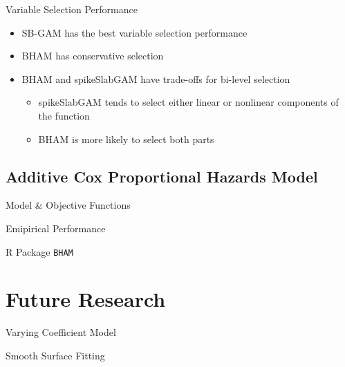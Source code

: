 \documentclass[
  ignorenonframetext,
  aspectratio=169]{beamer}
\providecommand{\tightlist}{%
  \setlength{\itemsep}{0pt}\setlength{\parskip}{0pt}}
\begin{document}
\begin{frame}{Variable Selection Performance}
\protect\hypertarget{variable-selection-performance}{}
\begin{itemize}
\tightlist
\item
  SB-GAM has the best variable selection performance
\item
  BHAM has conservative selection
\item
  BHAM and spikeSlabGAM have trade-offs for bi-level selection

  \begin{itemize}
  \tightlist
  \item
    spikeSlabGAM tends to select either linear or nonlinear components
    of the function
  \item
    BHAM is more likely to select both parts
  \end{itemize}
\end{itemize}
\end{frame}

\hypertarget{additive-cox-proportional-hazards-model}{%
\subsection{Additive Cox Proportional Hazards
Model}\label{additive-cox-proportional-hazards-model}}

\begin{frame}{Model \& Objective Functions}
\protect\hypertarget{model-objective-functions}{}
\end{frame}

\begin{frame}{Emipirical Performance}
\protect\hypertarget{emipirical-performance}{}
\end{frame}

\begin{frame}{R Package \texttt{BHAM}}
\protect\hypertarget{r-package-bham}{}
\end{frame}

\hypertarget{future-research}{%
\section{Future Research}\label{future-research}}

\begin{frame}{Varying Coefficient Model}
\protect\hypertarget{varying-coefficient-model}{}
\end{frame}

\begin{frame}{Smooth Surface Fitting}
\protect\hypertarget{smooth-surface-fitting}{}
\end{frame}
\end{document}
